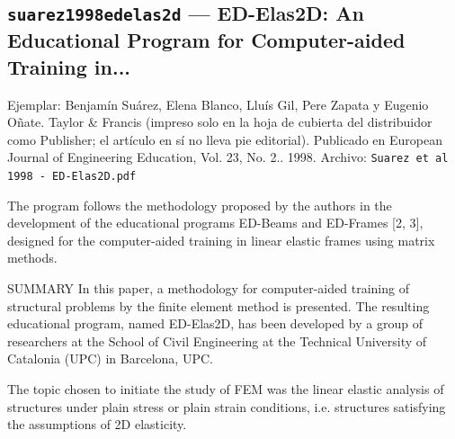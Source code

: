 \documentclass[11pt,a4paper]{article}
\newcommand{\campo}[1]{\textcolor{gris}{\footnotesize #1}}
\begin{document}
\subsection{\texttt{suarez1998edelas2d} --- ED-Elas2D: An Educational Program for Computer-aided Training in...}
{\footnotesize\campo{Ejemplar:} Benjamín Suárez, Elena Blanco, Lluís Gil, Pere Zapata y Eugenio Oñate. Taylor \& Francis (impreso solo en la hoja de cubierta del distribuidor como Publisher; el artículo en sí no lleva pie editorial). Publicado en European Journal of Engineering Education, Vol. 23, No. 2.. 1998. \campo{Archivo:} \texttt{Suarez et al 1998 - ED-Elas2D.pdf}\par}\vspace{4pt}
\vspace{3pt}\noindent{\small\textbf{p.\ 243} \quad \campo{Bishay se inscribe «en la línea de programas previos como ED-Beams y ED-Frames» (capitulos/02\_marco\_teorico.tex:11)}}\par
\begin{pasaje}\footnotesize The program follows the methodology proposed by the authors in the development of the educational programs ED-Beams and ED-Frames [2, 3], designed for the computer-aided training in linear elastic frames using matrix methods.\end{pasaje}
\vspace{3pt}\noindent{\small\textbf{p.\ 243} \quad \campo{ED-Elas2D es «un programa educativo desarrollado en la Universitat Politècnica de Catalunya para el adiestramiento asistido por computadora en el análisis de sólidos bidimensionales por el MEF» (02\_marco\_teorico.tex:13)}}\par
\begin{pasaje}\footnotesize SUMMARY In this paper, a methodology for computer-aided training of structural problems by the finite element method is presented. The resulting educational program, named ED-Elas2D, has been developed by a group of researchers at the School of Civil Engineering at the Technical University of Catalonia (UPC) in Barcelona, UPC.\end{pasaje}
\vspace{3pt}\noindent{\small\textbf{p.\ 244} \quad \campo{ED-Elas2D comparte con EduFEM el dominio: «elasticidad plana en tensión y deformación plana» (02\_marco\_teorico.tex:13)}}\par
\begin{pasaje}\footnotesize The topic chosen to initiate the study of FEM was the linear elastic analysis of structures under plain stress or plain strain conditions, i.e. structures satisfying the assumptions of 2D elasticity.\end{pasaje}
\end{document}

